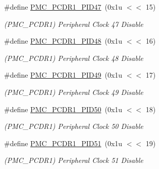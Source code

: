 \begin{DoxyCompactItemize}
\mbox{\label{group__SAMS70__PMC_ga3cc4b2e7791a7ea64566ff7b440994f1}} 
\#define \mbox{\hyperlink{group__SAMS70__PMC_ga3cc4b2e7791a7ea64566ff7b440994f1}{P\+M\+C\+\_\+\+P\+C\+D\+R1\+\_\+\+P\+I\+D47}}~(0x1u $<$$<$ 15)
\begin{DoxyCompactList}\small\item\em (P\+M\+C\+\_\+\+P\+C\+D\+R1) Peripheral Clock 47 Disable \end{DoxyCompactList}\item 
\mbox{\label{group__SAMS70__PMC_ga7f62bb05429b3a59e986799ab0e41e35}} 
\#define \mbox{\hyperlink{group__SAMS70__PMC_ga7f62bb05429b3a59e986799ab0e41e35}{P\+M\+C\+\_\+\+P\+C\+D\+R1\+\_\+\+P\+I\+D48}}~(0x1u $<$$<$ 16)
\begin{DoxyCompactList}\small\item\em (P\+M\+C\+\_\+\+P\+C\+D\+R1) Peripheral Clock 48 Disable \end{DoxyCompactList}\item 
\mbox{\label{group__SAMS70__PMC_gacdeac0f755374592760006417379d589}} 
\#define \mbox{\hyperlink{group__SAMS70__PMC_gacdeac0f755374592760006417379d589}{P\+M\+C\+\_\+\+P\+C\+D\+R1\+\_\+\+P\+I\+D49}}~(0x1u $<$$<$ 17)
\begin{DoxyCompactList}\small\item\em (P\+M\+C\+\_\+\+P\+C\+D\+R1) Peripheral Clock 49 Disable \end{DoxyCompactList}\item 
\mbox{\label{group__SAMS70__PMC_gae06b0c5224137b0fe2386637f32a2ec1}} 
\#define \mbox{\hyperlink{group__SAMS70__PMC_gae06b0c5224137b0fe2386637f32a2ec1}{P\+M\+C\+\_\+\+P\+C\+D\+R1\+\_\+\+P\+I\+D50}}~(0x1u $<$$<$ 18)
\begin{DoxyCompactList}\small\item\em (P\+M\+C\+\_\+\+P\+C\+D\+R1) Peripheral Clock 50 Disable \end{DoxyCompactList}\item 
\mbox{\label{group__SAMS70__PMC_ga68543bfbfe3db34ff6747473419ef92d}} 
\#define \mbox{\hyperlink{group__SAMS70__PMC_ga68543bfbfe3db34ff6747473419ef92d}{P\+M\+C\+\_\+\+P\+C\+D\+R1\+\_\+\+P\+I\+D51}}~(0x1u $<$$<$ 19)
\begin{DoxyCompactList}\small\item\em (P\+M\+C\+\_\+\+P\+C\+D\+R1) Peripheral Clock 51 Disable \end{DoxyCompactList}\item 
$$
\end{DoxyCompactItemize}
